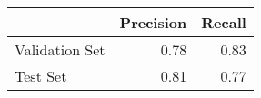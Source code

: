 \begin{tabular}{lrr}
\toprule
{} &  Precision &  Recall \\
\midrule
Validation Set &       0.78 &    0.83 \\
Test Set       &       0.81 &    0.77 \\
\bottomrule
\end{tabular}
